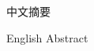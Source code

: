 \begin{cnabstract}

中文摘要


\end{cnabstract}

\begin{enabstract}

English Abstract


\end{enabstract}
